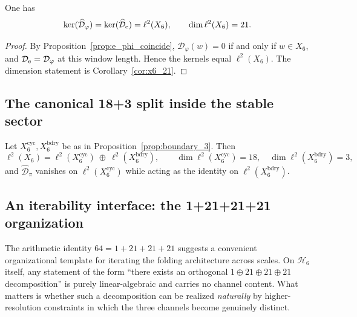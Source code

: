 \begin{theorem}
\label{thm:stable_21}
One has
\[
\ker(\widehat{\mathcal{D}}_\varphi)=\ker(\widehat{\mathcal{D}}_{\mathrm{e}})=\ell^2(X_6),
\qquad \dim \ell^2(X_6)=21.
\]
\end{theorem}

\begin{proof}
By Proposition~\ref{prop:e_phi_coincide}, $\mathcal{D}_\varphi(w)=0$ if and only if $w\in X_6$, and $\mathcal{D}_{\mathrm{e}}=\mathcal{D}_\varphi$ at this window length.
Hence the kernels equal $\ell^2(X_6)$.
The dimension statement is Corollary~\ref{cor:x6_21}.
\end{proof}

\subsection{The canonical 18+3 split inside the stable sector}
Let $X_6^{\mathrm{cyc}},X_6^{\mathrm{bdry}}$ be as in Proposition~\ref{prop:boundary_3}.
Then
\[
\ell^2(X_6)=\ell^2(X_6^{\mathrm{cyc}})\ \oplus\ \ell^2(X_6^{\mathrm{bdry}}),
\qquad \dim \ell^2(X_6^{\mathrm{cyc}})=18,\quad \dim \ell^2(X_6^{\mathrm{bdry}})=3,
\]
and $\widehat{\mathcal{D}}_\pi$ vanishes on $\ell^2(X_6^{\mathrm{cyc}})$ while acting as the identity on $\ell^2(X_6^{\mathrm{bdry}})$.

\subsection{An iterability interface: the 1+21+21+21 organization}
\label{subsec:iterability_axiom}
The arithmetic identity $64=1+21+21+21$ suggests a convenient organizational template for iterating the folding architecture across scales.
On $\mathcal{H}_6$ itself, any statement of the form ``there exists an orthogonal $1\oplus 21\oplus 21\oplus 21$ decomposition'' is purely linear-algebraic and carries no channel content.
What matters is whether such a decomposition can be realized \emph{naturally} by higher-resolution constraints in which the three channels become genuinely distinct.

